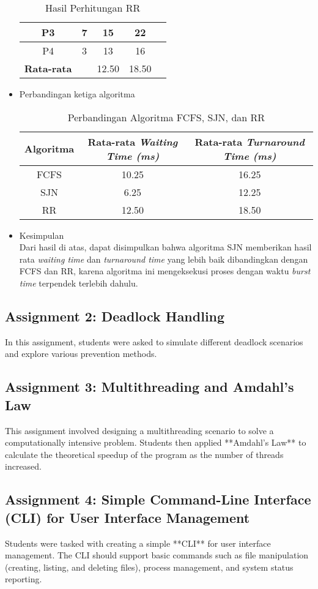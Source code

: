\documentclass[12pt]{article}
\begin{document}
\begin{itemize}
\begin{table}[H]
\begin{tabular}{|c|c|c|c|c|}
    P3 & 7 & 15 & 22 \\ \hline
    P4 & 3 & 13 & 16 \\ \hline
    \textbf{Rata-rata} &  & 12.50 & 18.50 \\ \hline
    \end{tabular}
    \caption{Hasil Perhitungan RR}
    \end{table}
    \item Perbandingan ketiga algoritma
    \begin{table}[H]
    \centering
    \begin{tabular}{|c|c|c|}
    \hline
    \textbf{Algoritma} & \textbf{Rata-rata \textit{Waiting Time (ms)}} & \textbf{Rata-rata \textit{Turnaround Time (ms)}} \\ \hline
    FCFS & 10.25 & 16.25 \\ \hline
    SJN  & 6.25  & 12.25 \\ \hline
    RR   & 12.50 & 18.50 \\ \hline
    \end{tabular}
    \caption{Perbandingan Algoritma FCFS, SJN, dan RR}
    \end{table}
    \item Kesimpulan \\
    Dari hasil di atas, dapat disimpulkan bahwa algoritma SJN memberikan hasil rata \textit{waiting time} dan \textit{turnaround time} yang lebih baik dibandingkan dengan FCFS dan RR, karena algoritma ini mengeksekusi proses dengan waktu \textit{burst time} terpendek terlebih dahulu. 
    \end{itemize}
    
\subsection{Assignment 2: Deadlock Handling}
In this assignment, students were asked to simulate different deadlock scenarios and explore various prevention methods.

\subsection{Assignment 3: Multithreading and Amdahl's Law}
This assignment involved designing a multithreading scenario to solve a computationally intensive problem. Students then applied **Amdahl's Law** to calculate the theoretical speedup of the program as the number of threads increased.

\subsection{Assignment 4: Simple Command-Line Interface (CLI) for User Interface Management}
Students were tasked with creating a simple **CLI** for user interface management. The CLI should support basic commands such as file manipulation (creating, listing, and deleting files), process management, and system status reporting.
\end{document}
